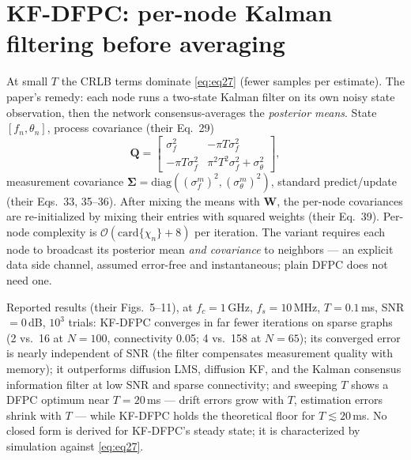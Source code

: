 \documentclass[10pt]{article}
\begin{document}
\section{KF-DFPC: per-node Kalman filtering before averaging}
At small $T$ the CRLB terms dominate \eqref{eq:eq27} (fewer samples per
estimate). The paper's remedy: each node runs a two-state Kalman filter
on its own noisy state observation, then the network consensus-averages
the \emph{posterior means}. State $[f_n,\theta_n]$, process covariance
(their Eq.~29)
\begin{equation}
\mathbf Q=\begin{bmatrix}\sigma_f^2 & -\pi T\sigma_f^2\\
-\pi T\sigma_f^2 & \pi^2T^2\sigma_f^2+\sigma_\theta^2\end{bmatrix},
\end{equation}
measurement covariance $\boldsymbol\Sigma=
\mathrm{diag}((\sigma^m_f)^2,(\sigma^m_\theta)^2)$, standard
predict/update (their Eqs.~33, 35--36). After mixing the means with
$\mathbf W$, the per-node covariances are re-initialized by mixing their
entries with squared weights (their Eq.~39). Per-node complexity is
$\mathcal O(\mathrm{card}\{\chi_n\}+8)$ per iteration. The variant
requires each node to broadcast its posterior mean \emph{and covariance}
to neighbors --- an explicit data side channel, assumed error-free and
instantaneous; plain DFPC does not need one.

Reported results (their Figs.~5--11), at $f_c=1$\,GHz, $f_s=10$\,MHz,
$T=0.1$\,ms, SNR $=0$\,dB, $10^3$ trials: KF-DFPC converges in far fewer
iterations on sparse graphs (2 vs.\ 16 at $N{=}100$, connectivity 0.05;
4 vs.\ 158 at $N{=}65$); its converged error is nearly independent of SNR
(the filter compensates measurement quality with memory); it outperforms
diffusion LMS, diffusion KF, and the Kalman consensus information filter
at low SNR and sparse connectivity; and sweeping $T$ shows a DFPC optimum
near $T=20$\,ms --- drift errors grow with $T$, estimation errors shrink
with $T$ --- while KF-DFPC holds the theoretical floor for
$T\lesssim20$\,ms. No closed form is derived for KF-DFPC's steady state;
it is characterized by simulation against \eqref{eq:eq27}.
\end{document}
